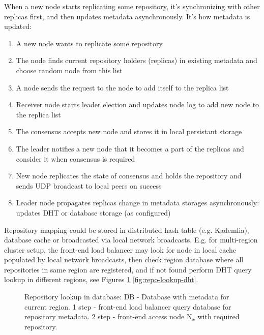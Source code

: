 \documentclass[acmlarge, screen, nonacm]{acmart}
\begin{document}
When a new node starts replicating some repository, it's synchronizing with other replicas first, and then
updates metadata asynchronously. It's how metadata is updated:
\begin{enumerate}
  \item A new node wants to replicate some repository
  \item The node finds current repository holders (replicas) in existing metadata and choose random node from this list
  \item A node sends the request to the node to add itself to the replica list
  \item Receiver node starts leader election and updates node log to add new node to the replica list
  \item The consensus accepts new node and stores it in local persistant storage
  \item The leader notifies a new node that it becomes a part of the replicas and consider it when consensus is required
  \item New node replicates the state of consensus and holds the repository and sends UDP broadcast to
    local peers on success
  \item Leader node propagates replicas change in metadata storages asynchronously: updates DHT or database storage
    (as configured)
\end{enumerate}

Repository mapping could be stored in distributed hash table (e.g. Kademlia),
database cache or broadcasted via local network broadcasts.
E.g. for multi-region cluster setup, the front-end load balancer may look for node in local cache
populated by local network broadcasts, then check region database where all repositories in same region are
registered, and if not found perform DHT query lookup in different regions,
see Figures \ref{fig:repo-lookup-db} \ref{fig:repo-lookup-dht}.

\begin{figure}
  \begin{center}
  \end{center}
  \caption{
    Repository lookup in database:
    DB - Database with metadata for current region.
    1 step - front-end load balancer query database for repository metadata.
    2 step - front-end access node N$_{x}$ with required repository.
  }
  \label{fig:repo-lookup-db}
\end{figure}
\end{document}
